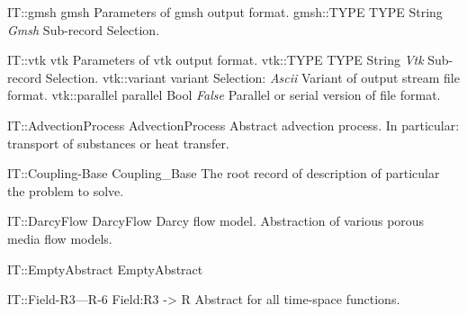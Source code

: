 \begin{RecordType}
	{IT::gmsh}
	{gmsh}
	{} %
	{} %
	{{{Parameters of gmsh output format.}}}
		\RecKey
			{gmsh::TYPE}
			{TYPE}
			{{String}}
			{ \it{Gmsh} }
			{{{Sub-record Selection.}}}
\end{RecordType}
\begin{RecordType}
	{IT::vtk}
	{vtk}
	{} %
	{} %
	{{{Parameters of vtk output format.}}}
		\RecKey
			{vtk::TYPE}
			{TYPE}
			{{String}}
			{ \it{Vtk} }
			{{{Sub-record Selection.}}}
		\RecKey
			{vtk::variant}
			{variant}
			{{Selection}{: }}
			{ \it{Ascii} }
			{{{Variant of output stream file format.}}}
		\RecKey
			{vtk::parallel}
			{parallel}
			{{Bool}}
			{ \it{False} }
			{{{Parallel or serial version of file format.}}}
\end{RecordType}
\begin{AbstractType}
	{IT::AdvectionProcess}
	{AdvectionProcess}
	{}
	{{{Abstract advection process. In particular: transport of substances or heat transfer.}}}
\end{AbstractType}
\begin{AbstractType}
	{IT::Coupling-Base}
	{Coupling{\_}Base}
	{}
	{{{The root record of description of particular the problem to solve.}}}
\end{AbstractType}
\begin{AbstractType}
	{IT::DarcyFlow}
	{DarcyFlow}
	{}
	{{{Darcy flow model. Abstraction of various porous media flow models.}}}
\end{AbstractType}
\begin{AbstractType}
	{IT::EmptyAbstract}
	{EmptyAbstract}
	{}
	{}
\end{AbstractType}
\begin{AbstractType}
	{IT::Field-R3---R-6}
	{Field:R3 -{\textgreater} R}
	{}
	{{{Abstract for all time-space functions.}}}
\end{AbstractType}
